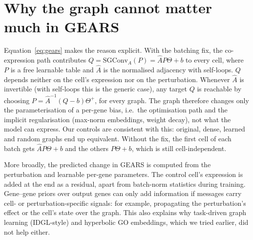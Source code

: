 \documentclass[11pt]{article}
\newcommand{\GEARS}{\textsc{GEARS}}
\begin{document}
\section{Why the graph cannot matter much in GEARS}
Equation~\ref{eq:gears} makes the reason explicit. With the batching fix, the co-expression path contributes
$Q = \mathrm{SGConv}_A(P) = \hat{A} P \Theta + b$ to every cell, where $P$ is a free learnable table and
$\hat{A}$ is the normalised adjacency with self-loops. $Q$ depends neither on the cell's expression nor on the
perturbation. Whenever $\hat{A}$ is invertible (with self-loops this is the generic case), any target $Q$ is
reachable by choosing $P = \hat{A}^{-1}(Q-b)\Theta^{+}$, for every graph. The graph therefore changes only the
parameterisation of a per-gene bias, i.e.\ the optimisation path and the implicit regularisation (max-norm
embeddings, weight decay), not what the model can express. Our controls are consistent with this: original, dense,
learned and random graphs end up equivalent. Without the fix, the first cell of each batch gets
$\hat{A}P\Theta+b$ and the others $P\Theta+b$, which is still cell-independent.

More broadly, the predicted change in \GEARS{} is computed from the perturbation and learnable per-gene parameters.
The control cell's expression is added at the end as a residual, apart from batch-norm statistics during training.
Gene--gene priors over output genes can only add information if messages carry cell- or perturbation-specific
signals: for example, propagating the perturbation's effect or the cell's state over the graph. This also explains
why task-driven graph learning (IDGL-style) and hyperbolic GO embeddings, which we tried earlier, did not help
either.

\end{document}
